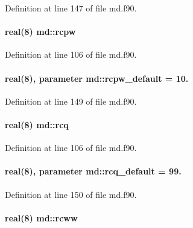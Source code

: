 Definition at line 147 of file md.\-f90.

\hypertarget{classmd_ae677687763066409ae149979e9ba9bc3}{
\paragraph[{rcpw}]{\setlength{\rightskip}{0pt plus 5cm}real(8) md\-::rcpw}}\label{classmd_ae677687763066409ae149979e9ba9bc3}


Definition at line 106 of file md.\-f90.

\hypertarget{classmd_aacf31a06d22b560d5bd1fd8aaa25f4e8}{
\paragraph[{rcpw\-\_\-default}]{\setlength{\rightskip}{0pt plus 5cm}real(8), parameter md\-::rcpw\-\_\-default = 10.}}\label{classmd_aacf31a06d22b560d5bd1fd8aaa25f4e8}


Definition at line 149 of file md.\-f90.

\hypertarget{classmd_a2482363af4bc9cded92dfecf1401df51}{
\paragraph[{rcq}]{\setlength{\rightskip}{0pt plus 5cm}real(8) md\-::rcq}}\label{classmd_a2482363af4bc9cded92dfecf1401df51}


Definition at line 106 of file md.\-f90.

\hypertarget{classmd_ad865c88f84f85d3271c93b4667804f27}{
\paragraph[{rcq\-\_\-default}]{\setlength{\rightskip}{0pt plus 5cm}real(8), parameter md\-::rcq\-\_\-default = 99.}}\label{classmd_ad865c88f84f85d3271c93b4667804f27}


Definition at line 150 of file md.\-f90.

\hypertarget{classmd_af0e149922fc555a967a6e9da995bb092}{
\paragraph[{rcww}]{\setlength{\rightskip}{0pt plus 5cm}real(8) md\-::rcww}}\label{classmd_af0e149922fc555a967a6e9da995bb092}


